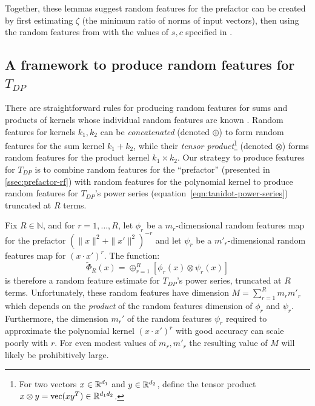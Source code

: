 Together, these lemmas suggest random features for the prefactor can be created
by first estimating $\zeta$ (the minimum ratio of norms of input vectors),
then using the random features from  with the
values of $s,c$ specified in .












\subsection{A framework to produce random features for $T_{DP}$}
\label{sec:tdp-rf}

There are straightforward rules for producing random features for sums and products of kernels whose individual random features are known \citep[sec.\@ 2.6.2]{duvenaud_2014}.
Random features for kernels $k_1,k_2$ can be \emph{concatenated} (denoted $\oplus$) to form random features for the sum kernel $k_1+k_2$,
while their \emph{tensor product}\footnote{
For two vectors $x\in\mathbb{R}^{d_1}$ and $y\in\mathbb{R}^{d_2}$, define the tensor product $x\otimes y = \text{vec}(xy^T) \in \mathbb{R}^{d_1d_2}$.
} (denoted $\otimes$)
forms random features for the product kernel $k_1\times k_2$.
Our strategy to produce features for $T_{DP}$ is
to combine random features for the ``prefactor'' (presented in \cref{ssec:prefactor-rf})
with random features for the polynomial kernel to produce random features for $T_{DP}$'s power series (equation~\ref{eqn:tanidot-power-series}) truncated at $R$ terms.

Fix $R\in\mathbb{N}$, and for $r=1,\ldots,R$, let $\phi_r$ be a $m_r$-dimensional random features map for the prefactor
$\textstyle (\|x\|^2 + \|x'\|^2)^{-r}$ and let $\psi_r$ be a $m'_r$-dimensional random features map for
$\left(x\cdot x'\right)^r$. The function:
\begin{equation}\label{naive tensor product rfs}
    \tilde\Phi_R(x) = \oplus_{r=1}^R \left[\phi_r(x) \otimes \psi_r(x)\right]
\end{equation}
is therefore a random feature estimate for $T_{DP}$'s power series, truncated at $R$ terms.
Unfortunately, these random features have dimension 
$M=\sum_{r=1}^R m_r m'_r$
which depends on the \emph{product} of the random features dimension of $\phi_r$ and $\psi_r$. Furthermore, the dimension $m_r'$ of the random features $\psi_r$ required to approximate the polynomial kernel $(x\cdot x')^r$ with good accuracy can scale poorly with $r$.
For even modest values of $m_r,m'_r$ the resulting value of $M$ will likely be prohibitively large.

